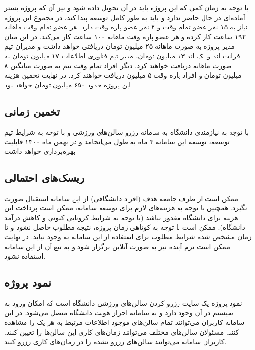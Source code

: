 با توجه به زمان کمی که این پروژه باید در آن تحویل داده شود و نیز آن‌ که پروژه بستر آماده‌ای در حال حاضر ندارد و باید به طور کامل توسعه پیدا کند، در مجموع این پروژه نیاز به ۱۵ نفر عضو تمام وقت و ۲ نفر عضو پاره وقت دارد. هر عضو تمام وقت ماهانه ۱۹۲ ساعت کار کرده و هر عضو پاره وقت ماهانه ۱۰۰ ساعت کار می‌کند. در این میان مدیر پروژه به صورت ماهانه ۲۵ میلیون تومان دریافتی خواهد داشت و مدیران تیم فرانت اند و بک اند ۱۳ میلیون تومان، مدیر تیم فناوری اطلاعات ۱۷ میلیون تومان به صورت ماهانه دریافت خواهند کرد. دیگر افراد تمام وقت تیم به صورت میانگین ۸ میلیون تومان و افراد پاره وقت ۵ میلیون دریافت خواهند کرد. در نهایت تخمین هزینه این پروژه حدود ۶۵۰ میلیون تومان خواهد بود.


\subsection*{
تخمین زمانی
}

با توجه به نیازمندی دانشگاه به سامانه رزرو سالن‌های ورزشی و با توجه به شرایط تیم توسعه، توسعه این سامانه ۳ ماه به طول می‌انجامد و در بهمن ماه ۱۴۰۰ قابلیت بهره‌برداری خواهد داشت.


\subsection*{
ریسک‌های احتمالی
}

ممکن است از طرف جامعه هدف (افراد دانشگاهی) از این سامانه استقبال صورت نگیرد. همچنین با توجه به هزینه‌های لازم برای توسعه سامانه، ممکن است پرداخت این هزینه برای دانشگاه مقدور نباشد (با توجه به شرایط کرونایی کنونی و کاهش درآمد دانشگاه). ممکن است با توجه به کوتاهی زمان پروژه، نتیجه مطلوب حاصل نشود و تا زمان مشخص شده شرایط مطلوب برای استفاده از این سامانه به وجود نیاید. در نهایت ممکن است ترم آینده نیز به صورت آنلاین برگزار شود و به تبع آن از این سامانه استفاده نشود.


\subsection*{
نمود پروژه
}

نمود پروژه یک سایت رزرو کردن سالن‌های ورزشی دانشگاه است که امکان ورود به سیستم در آن وجود دارد و به سامانه احراز هویت دانشگاه متصل می‌شود. در این سامانه کاربران می‌توانند تمام سالن‌های موجود اطلاعات مرتبط به هر یک را مشاهده کنند. مسئولان سالن‌های مختلف می‌توانند زمان‌های کاری این سالن‌ها را تعیین کنند. کاربران سامانه می‌توانند سالن‌های رزرو نشده را در زمان‌های کاری رزرو کنند.
